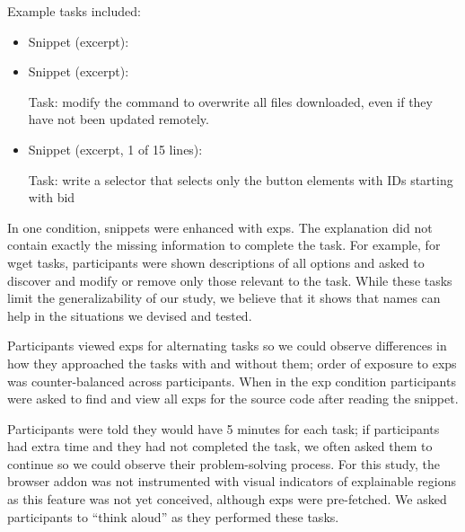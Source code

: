 Example tasks included:
\begin{itemize}

\item
Snippet (excerpt):

\item
Snippet (excerpt):


Task: modify the command to overwrite all files downloaded, even if they have not been updated remotely.

\item

Snippet (excerpt, 1 of 15 lines):


Task: write a selector that selects only the button elements with IDs starting with bid

\end{itemize}
\fi
%
\begin{changes}
In one condition, snippets were enhanced with \glspl{exp}.
The explanation did not contain exactly the missing information to complete the task.
For example, for wget tasks, participants were shown descriptions of all options and asked to discover and modify or remove only those relevant to the task.
While these tasks limit the generalizability of our study, we believe that it shows that \Glspl{name} can help in the situations we devised and tested.

Participants viewed \glspl{exp} for alternating tasks so we could observe differences in how they approached the tasks with and without them; order of exposure to \glspl{exp} was counter-balanced across participants. 
When in the \gls{exp} condition participants were asked to find and view all \glspl{exp} for the source code after reading the snippet.

Participants were told they would have 5 minutes for each task; if participants had extra time and they had not completed the task, we often asked them to continue so we could observe their problem-solving process.
For this study, the browser addon was not instrumented with visual indicators of explainable regions as this feature was not yet conceived, although \glspl{exp} were pre-fetched.
We asked participants to ``think aloud'' as they performed these tasks.

\end{changes}

